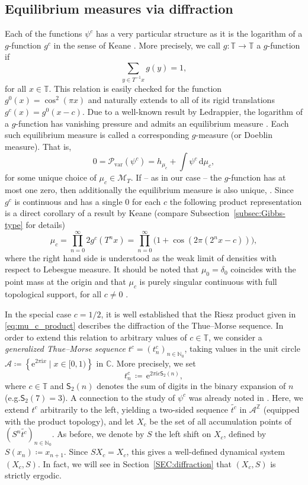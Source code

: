 \documentclass[11pt,reqno]{amsart}
\theoremstyle{plain}
\theoremstyle{definition}
\newcommand{\Z}{{\mathbb Z}}
\newcommand{\N}{{\mathbb N}}
\newcommand{\C}{{\mathbb C}}
\newcommand{\T}{{\mathbb T}}
\newcommand{\mc}{\mathcal}
\newcommand{\im}{{\mathrm{i}}}
\newcommand{\me}{\mathrm{e}}
\newcommand{\dd}{\,\mathrm{d}}
\newcommand{\ts}{\hspace{0.5pt}}
\newcommand{\TT}{\mathbb{T}}
\begin{document}
\subsection{Equilibrium measures via diffraction}
Each of the functions $\psi^c$ has a very particular structure as it is the logarithm of a $g$-function $g^c$ in the sense of Keane \cite{Kea72}. More precisely, we call $g\colon \TT \to \TT$ a $g$-function if 
\[
\sum_{y \in T^{-1}x} g(y) = 1,
\]
for all $x \in \TT$. This relation is easily checked for the function $g^0(x) = \cos^2(\pi x)$ and naturally extends to all of its rigid translations $g^c(x) = g^0(x-c)$. Due to a well-known result by Ledrappier, the logarithm of a $g$-function has vanishing pressure and  admits an equilibrium measure \cite{Ledrappier}. Each such equilibrium measure is called a corresponding $g$-measure (or Doeblin measure).
That is,
\[
0 = \mathcal{P}_{\operatorname{var}}(\psi^c) = h_{\mu_c} + \int \psi^c \dd \mu_c,
\]
for some unique choice of $\mu_c \in \mathcal{M}_T$. 
If -- as in our case -- the $g$-function has at most one zero, then additionally the equilibrium measure is also unique, \cite{Kea72}.
Since $g^c$ is continuous and has a single $0$ for each $c$ the following product representation is a direct corollary of a result by Keane \cite{Kea72} (compare  Subsection~\ref{subsec:Gibbs-type} for details)
\begin{equation}
\label{eq:mu_c_product}
\mu_c = \prod_{n=0}^{\infty} 2 g^c(T^n x)
= \prod_{n=0}^{\infty} \bigl(1 + \cos(2\pi (2^n x - c) ) \bigr),
\end{equation}
where the right hand side is understood as the weak limit of densities with respect to Lebesgue measure. It should be noted that $\mu_0 = \delta_0$ coincides with the point mass at the origin and that $\mu_c$ is purely singular continuous with full topological support, for all $c\neq 0$ \cite{BCEG}.

In the special case $c=1/2$, it is well established that the Riesz product given in \eqref{eq:mu_c_product} describes the diffraction of the Thue{\ts}--Morse sequence. In order to extend this relation to arbitrary values of $c \in \TT$, 
we consider a {\em generalized Thue{\ts}--Morse sequence} $t^{c} = (t_n^{c})_{n \in \N_0}$, taking values in the unit circle $\mc A \coloneqq \left\{ \me^{2 \pi \im x} \mid x \in [0,1) \right\}$ in $\C$. 
More precisely, we set
\begin{equation}
t^{c}_n\, \coloneqq \, \me^{2 \pi \im c \mathsf{S}_2(n)},\label{eq: tnc}
\end{equation}
where $c\in \T$ and $\mathsf{S}_2(n)$ denotes the sum of digits in the binary expansion of $n$ (e.g.\@ $\mathsf{S}_{2}(7)=3$). A connection to the study of $\psi^c$ was already noted in \cite{fan_generalized_2020}. Here, we extend $t^c$ arbitrarily to the left, yielding a two-sided sequence $\widetilde{t^c}$ in $\mc A^{\Z}$ (equipped with the product topology), and let $X_c$ be the set of all accumulation points of $(S^n \widetilde{t^c})_{n \in \N_0}$. As before, we denote by $S$ the left shift on $X_c$, defined by $S(x_n) \coloneqq x_{n+1}$. Since $S X_c = X_c$, this gives a well-defined dynamical system $(X_c, S)$. In fact, we will see in Section~\ref{SEC:diffraction} that $(X_c,S)$ is strictly ergodic. 
\end{document}

